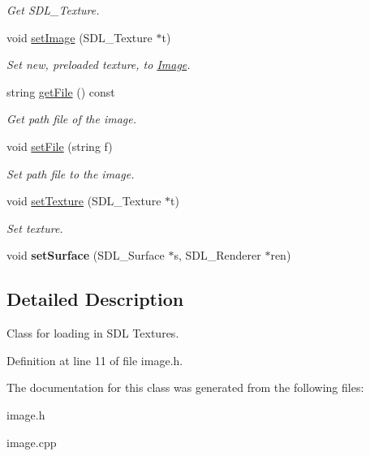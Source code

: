 \begin{DoxyCompactItemize}
\begin{DoxyCompactList}\small\item\em Get S\+D\+L\+\_\+\+Texture. \end{DoxyCompactList}\item 
\mbox{\label{classImage_af42b5d6a8abd90d67e9ae19e374520da}} 
void \hyperlink{classImage_af42b5d6a8abd90d67e9ae19e374520da}{set\+Image} (S\+D\+L\+\_\+\+Texture $\ast$t)
\begin{DoxyCompactList}\small\item\em Set new, preloaded texture, to \hyperlink{classImage}{Image}. \end{DoxyCompactList}\item 
\mbox{\label{classImage_a02c79bf17adf60ab25c93c5825f45be7}} 
string \hyperlink{classImage_a02c79bf17adf60ab25c93c5825f45be7}{get\+File} () const
\begin{DoxyCompactList}\small\item\em Get path file of the image. \end{DoxyCompactList}\item 
\mbox{\label{classImage_ab4030489c65a25b2e0c458acac0ca94e}} 
void \hyperlink{classImage_ab4030489c65a25b2e0c458acac0ca94e}{set\+File} (string f)
\begin{DoxyCompactList}\small\item\em Set path file to the image. \end{DoxyCompactList}\item 
\mbox{\label{classImage_a64fb847a42f4553c6e4a652107fb997b}} 
void \hyperlink{classImage_a64fb847a42f4553c6e4a652107fb997b}{set\+Texture} (S\+D\+L\+\_\+\+Texture $\ast$t)
\begin{DoxyCompactList}\small\item\em Set texture. \end{DoxyCompactList}\item 
\mbox{\label{classImage_acde2a6581da25188360a07d5da4c419b}} 
void {\bfseries set\+Surface} (S\+D\+L\+\_\+\+Surface $\ast$s, S\+D\+L\+\_\+\+Renderer $\ast$ren)
\end{DoxyCompactItemize}


\subsection{Detailed Description}
Class for loading in S\+DL Textures. 

Definition at line 11 of file image.\+h.



The documentation for this class was generated from the following files\+:\begin{DoxyCompactItemize}
\item 
image.\+h\item 
image.\+cpp\end{DoxyCompactItemize}
